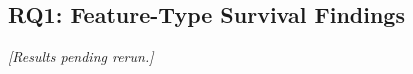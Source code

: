 \documentclass[11pt]{article}
\begin{document}

\subsection{RQ1: Feature-Type Survival Findings}
\emph{[Results pending rerun.]}
\end{document}
